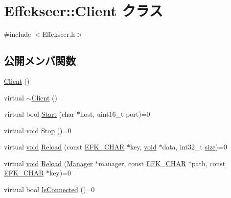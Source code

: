 \hypertarget{class_effekseer_1_1_client}{}\section{Effekseer\+:\+:Client クラス}
\label{class_effekseer_1_1_client}


{\ttfamily \#include $<$Effekseer.\+h$>$}

\subsection*{公開メンバ関数}
\begin{DoxyCompactItemize}
\item 
\mbox{\hyperlink{class_effekseer_1_1_client_a42b5bd5ae18884b4c884f94173c6e1e2}{Client}} ()
\item 
virtual \mbox{\hyperlink{class_effekseer_1_1_client_a77d6c51135b4e3b69b75bff309bb0a85}{$\sim$\+Client}} ()
\item 
virtual bool \mbox{\hyperlink{class_effekseer_1_1_client_a8ccf03136f886a34baeabcfd6d3e5cb4}{Start}} (char $\ast$host, uint16\+\_\+t port)=0
\item 
virtual \mbox{\hyperlink{namespace_effekseer_ab34c4088e512200cf4c2716f168deb56}{void}} \mbox{\hyperlink{class_effekseer_1_1_client_aa490dfe72eeb567e6eff19d9e8b850c1}{Stop}} ()=0
\item 
virtual \mbox{\hyperlink{namespace_effekseer_ab34c4088e512200cf4c2716f168deb56}{void}} \mbox{\hyperlink{class_effekseer_1_1_client_a3c80e7d4534a6697e20fc222df7b4598}{Reload}} (const \mbox{\hyperlink{_effekseer_8h_a50b026abea014b47854bcd835b3b6233}{E\+F\+K\+\_\+\+C\+H\+AR}} $\ast$key, \mbox{\hyperlink{namespace_effekseer_ab34c4088e512200cf4c2716f168deb56}{void}} $\ast$data, int32\+\_\+t \mbox{\hyperlink{namespace_effekseer_a73c68f3d33539d30844b9d1e058077f7}{size}})=0
\item 
virtual \mbox{\hyperlink{namespace_effekseer_ab34c4088e512200cf4c2716f168deb56}{void}} \mbox{\hyperlink{class_effekseer_1_1_client_a82cb4bc702a7cb270dd141fec9f62812}{Reload}} (\mbox{\hyperlink{class_effekseer_1_1_manager}{Manager}} $\ast$manager, const \mbox{\hyperlink{_effekseer_8h_a50b026abea014b47854bcd835b3b6233}{E\+F\+K\+\_\+\+C\+H\+AR}} $\ast$path, const \mbox{\hyperlink{_effekseer_8h_a50b026abea014b47854bcd835b3b6233}{E\+F\+K\+\_\+\+C\+H\+AR}} $\ast$key)=0
\item 
virtual bool \mbox{\hyperlink{class_effekseer_1_1_client_a83c2f00111623d0fe4536a197b7ac9b7}{Is\+Connected}} ()=0
\end{DoxyCompactItemize}
